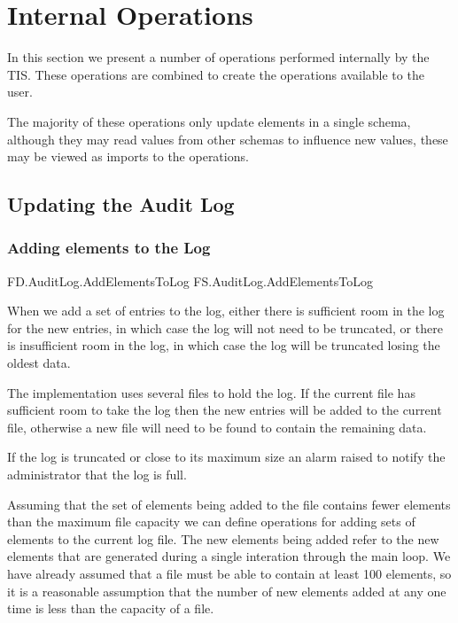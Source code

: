 
\chapter{Internal Operations}
\label{sec:Internal}
In this section we present a number of operations performed internally
by the TIS. These operations are combined to create the operations
available to the user.

The majority of these operations only update elements in a single
schema, although they may read values from other schemas to influence
new values, these may be viewed as imports to the operations.

\section{Updating the Audit Log}
\label{sec:logTr}
\subsection{Adding elements to the Log}

\begin{traceunit}{FD.AuditLog.AddElementsToLog}
{FS.AuditLog.AddElementsToLog}
\end{traceunit}

When we add a set of entries to the log, either there is sufficient
room in the log for the new entries, in which case the log will not
need to be truncated, or there is insufficient room in the log, in
which case the log will be truncated losing the oldest data.

The implementation uses several files to hold the log. If the current
file has sufficient room to take the log then the new entries will be
added to the current file, otherwise a new file will need to be found
to contain the remaining data.
 
If the log is truncated or close to its maximum size an alarm raised 
to notify the administrator that the log is full. 

Assuming that the set of elements being added to the file contains fewer
elements than the maximum file capacity we can define operations for
adding sets of elements to the current log file. 
The new elements being added refer to the new elements that are
generated during a single interation through the main loop. We have
already assumed that a file must be able to contain at least 100
elements, so it is a reasonable assumption that the number of new
elements added at any one time is less than the capacity of a file.

